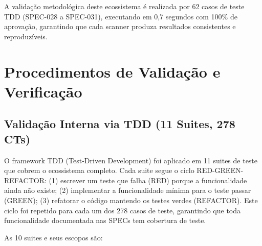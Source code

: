 A validação metodológica deste ecossistema é realizada por 62 casos de teste TDD (SPEC-028 a SPEC-031), executando em 0,7 segundos com 100\% de aprovação, garantindo que cada scanner produza resultados consistentes e reproduzíveis.

\section{Procedimentos de Validação e Verificação}

\subsection{Validação Interna via TDD (11 Suites, 278 CTs)}

O framework TDD (Test-Driven Development) foi aplicado em 11 suites de teste que cobrem o ecossistema completo. Cada suite segue o ciclo RED-GREEN-REFACTOR: (1) escrever um teste que falha (RED) porque a funcionalidade ainda não existe; (2) implementar a funcionalidade mínima para o teste passar (GREEN); (3) refatorar o código mantendo os testes verdes (REFACTOR). Este ciclo foi repetido para cada um dos 278 casos de teste, garantindo que toda funcionalidade documentada nas SPECs tem cobertura de teste.

As 10 suites e seus escopos são:

